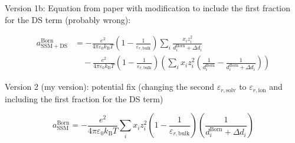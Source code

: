\documentclass[12pt, letterpaper]{article}
\begin{document}
Version 1b: Equation from paper with modification to include the first fraction for the DS term (probably wrong):~\cite{Figiel2025}


\begin{equation}
    \begin{aligned}
        a_{\mathrm{SSM+DS}}^{\mathrm{Born}}
        &=-\frac{e^{2}}{4\pi\varepsilon_{0}k_{\mathrm{B}}T}
        \left(1-\frac{1}{\varepsilon_{r,\mathrm{bulk}}}\right)
        \sum_{i}\frac{x_{i}z_{i}^{2}}{d_{i}^{\mathrm{Born}}+\Delta d_{i}}
        \\
        &\quad -\frac{e^{2}}{4\pi\varepsilon_{0}k_{\mathrm{B}}T}
        \left(1-\frac{1}{\varepsilon_{r,\mathrm{bulk}}}\right)
        \left(\sum_{i}x_{i}z_{i}^{2}
        \left(\frac{1}{d_{i}^{\mathrm{Born}}}-\frac{1}{d_{i}^{\mathrm{Born}}+\Delta d_{i}}\right)\right)
    \end{aligned}
    \label{eq:ares_born_ssmds_v2}
\end{equation}

Version 2 (my version): potential fix (changing the second $\varepsilon_{r,\mathrm{solv}}$ to $\varepsilon_{r,\mathrm{ion}}$ and including the first fraction for the DS term)


\begin{equation}
    a_{\mathrm{SSM}}^{\mathrm{Born}}=-\frac{e^{2}}{4\pi\varepsilon_{0}k_{\mathrm{B}}T}\sum_{i}x_{i}z_{i}^{2} \left(1-\frac{1}{\varepsilon_{r,\mathrm{bulk}}}\right)\left(\frac{1}{d_{i}^{\mathrm{Born}}+\Delta d_{i}}\right)
    \label{eq:ares_born_ssm}
\end{equation}

\end{document}
